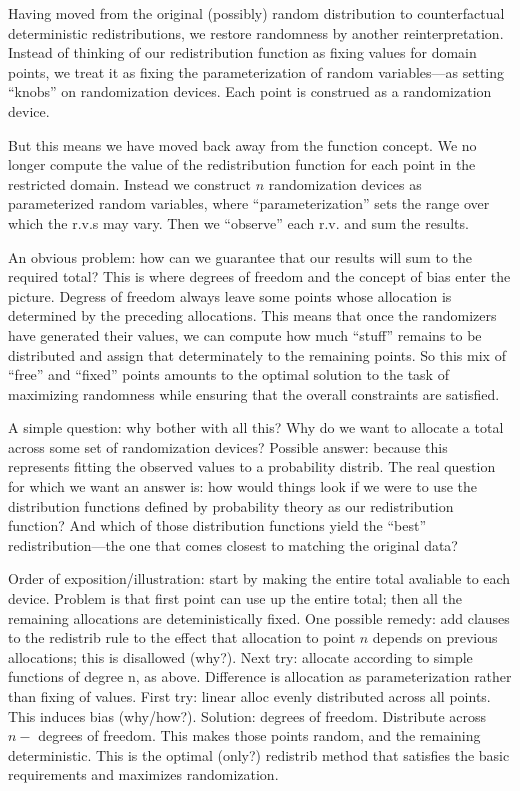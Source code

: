 \begin{ednote}
  Having moved from the original (possibly) random distribution to
  counterfactual deterministic redistributions, we restore randomness
  by another reinterpretation.  Instead of thinking of our
  redistribution function as fixing values for domain points, we treat
  it as fixing the parameterization of random variables---as setting
  ``knobs'' on randomization devices.  Each point is construed as a
  randomization device.

  But this means we have moved back away from the function concept.
  We no longer compute the value of the redistribution function for
  each point in the restricted domain.  Instead we construct \(n\)
  randomization devices as parameterized random variables, where
  ``parameterization'' sets the range over which the r.v.s may vary.
  Then we ``observe'' each r.v. and sum the results.

  An obvious problem: how can we guarantee that our results will sum
  to the required total?  This is where degrees of freedom and the
  concept of bias enter the picture.  Degress of freedom always leave
  some points whose allocation is determined by the preceding
  allocations.  This means that once the randomizers have generated
  their values, we can compute how much ``stuff'' remains to be
  distributed and assign that determinately to the remaining points.
  So this mix of ``free'' and ``fixed'' points amounts to the optimal
  solution to the task of maximizing randomness while ensuring that
  the overall constraints are satisfied.

  A simple question: why bother with all this?  Why do we want to
  allocate a total across some set of randomization devices?  Possible
  answer: because this represents fitting the observed values to a
  probability distrib.  The real question for which we want an answer
  is: how would things look if we were to use the distribution
  functions defined by probability theory as our redistribution
  function?  And which of those distribution functions yield the
  ``best'' redistribution---the one that comes closest to matching the
  original data?
\end{ednote}


\begin{ednote}
  Order of exposition/illustration: start by making the entire total
  avaliable to each device.  Problem is that first point can use up
  the entire total; then all the remaining allocations are
  deteministically fixed.  One possible remedy: add clauses to the
  redistrib rule to the effect that allocation to point \(n\) depends
  on previous allocations; this is disallowed (why?).  Next try:
  allocate according to simple functions of degree n, as above.
  Difference is allocation as parameterization rather than fixing of
  values.  First try: linear alloc evenly distributed across all
  points.  This induces bias (why/how?).  Solution: degrees of
  freedom.  Distribute across \(n -\) degrees of freedom.  This makes
  those points random, and the remaining deterministic.  This is the
  optimal (only?) redistrib method that satisfies the basic
  requirements and maximizes randomization.
\end{ednote}

